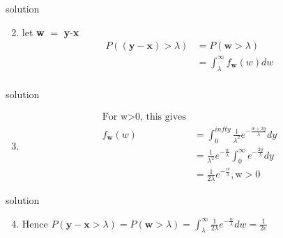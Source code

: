 \documentclass{beamer}
\begin{document}
\begin{frame}{solution}
\begin{enumerate}
\setcounter{enumi}{1}
\item let \textbf{w} $=$ \textbf{y}-\textbf{x}\\
\begin{align}
    P((\textbf{y}-\textbf{x})>\lambda) & = P(\textbf{w}>\lambda)\\
                                     & = \int_{\lambda}^{\infty}f_{\textbf{w}}(w)dw\nonumber\\
\end{align}
\end{enumerate}
\end{frame}
     

\begin{frame}{solution}
\begin{enumerate}
\setcounter{enumi}{2}
\item \begin{align}
    \text{For w}>\text{0, this gives}\\
    f_{\textbf{w}}(w) & = \int_{0}^{infty}\frac{1}{\lambda^2}e^{-\frac{w+2y}{\lambda}}dy\\
                      & = \frac{1}{\lambda^2}e^{-\frac{w}{\lambda}}\int_{0}^{\infty}e^{-\frac{2y}{\lambda}}dy\\
                      & = \frac{1}{2\lambda}e^{-\frac{w}{\lambda}},\text{w}>0
\end{align}
\end{enumerate}
\end{frame}
     

\begin{frame}{solution}
\begin{enumerate}
\setcounter{enumi}{3}
\item Hence $P(\textbf{y}-\textbf{x}>\lambda) = P(\textbf{w}>\lambda) = \int_{\lambda}^{\infty}\frac{1}{2\lambda}e^{-\frac{w}{\lambda}}dw = \frac{1}{2e}$
\end{enumerate}
\end{frame}
     
     
\end{document}
